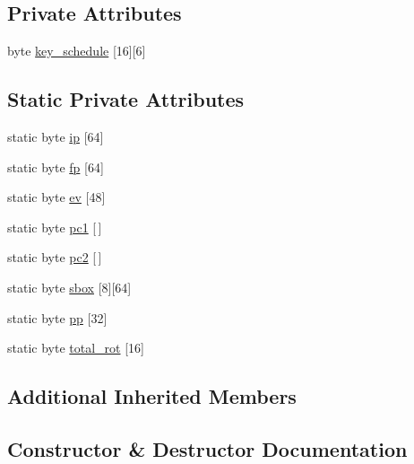 \subsection*{Private Attributes}
\begin{DoxyCompactItemize}
\item 
byte \hyperlink{classDESCipher_a15e4c952af35d6b2d19655422b63a54e}{key\+\_\+schedule} \mbox{[}16\mbox{]}\mbox{[}6\mbox{]}
\end{DoxyCompactItemize}
\subsection*{Static Private Attributes}
\begin{DoxyCompactItemize}
\item 
static byte \hyperlink{classDESCipher_aa9e5743835ee06b59c6fad7cf954fde2}{ip} \mbox{[}64\mbox{]}
\item 
static byte \hyperlink{classDESCipher_a4ed481831857615035c294e6a4fcee32}{fp} \mbox{[}64\mbox{]}
\item 
static byte \hyperlink{classDESCipher_a726a2b9846d18e19770eea6d046b3d42}{ev} \mbox{[}48\mbox{]}
\item 
static byte \hyperlink{classDESCipher_acde876e8b143237759022dd47f867945}{pc1} \mbox{[}$\,$\mbox{]}
\item 
static byte \hyperlink{classDESCipher_a16cb4a171e849e673cfaf3d864614e81}{pc2} \mbox{[}$\,$\mbox{]}
\item 
static byte \hyperlink{classDESCipher_af65a5877e08227f4f1817cc6c49dd9bb}{sbox} \mbox{[}8\mbox{]}\mbox{[}64\mbox{]}
\item 
static byte \hyperlink{classDESCipher_af44d8fee3816aeefffd2049697a177cc}{pp} \mbox{[}32\mbox{]}
\item 
static byte \hyperlink{classDESCipher_a28b1d159bad4462f7d89902cd65a8885}{total\+\_\+rot} \mbox{[}16\mbox{]}
\end{DoxyCompactItemize}
\subsection*{Additional Inherited Members}


\subsection{Constructor \& Destructor Documentation}
\mbox{\label{classDESCipher_a296b6450dbdf2c35c70c74c628d9176b}} 
